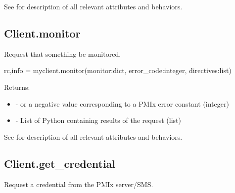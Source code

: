 See  for description of all relevant attributes and behaviors.


\subsection{Client.monitor}

\summary

Request that something be monitored.

\format

\pyspecificstart
\begin{codepar}
rc,info = myclient.monitor(monitor:dict, error_code:integer, directives:list)
\end{codepar}
\pyspecificend

\begin{arglist}
\end{arglist}

Returns:

\begin{itemize}
    \item {} -  or a negative value corresponding to a PMIx error constant (integer)
    \item {} - List of Python  containing results of the request (list)
\end{itemize}

See  for description of all relevant attributes and behaviors.


\subsection{Client.get_credential}

\summary

Request a credential from the PMIx server/SMS.

\format

